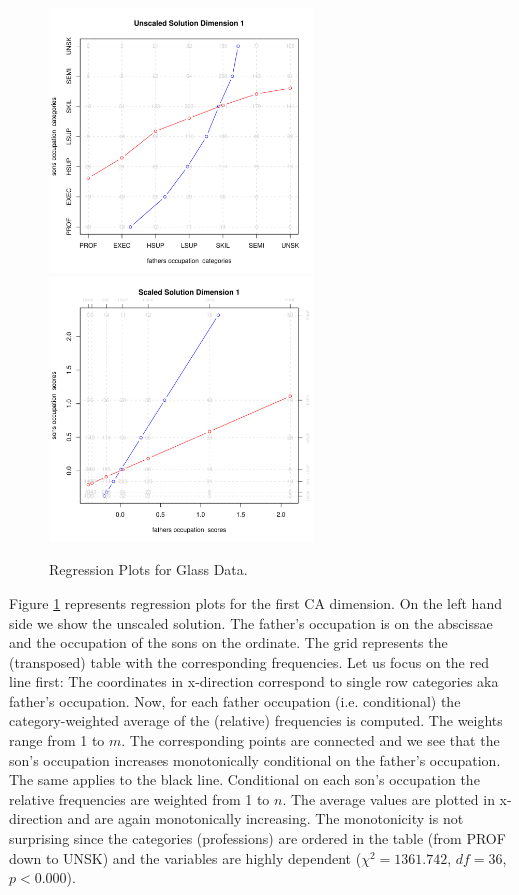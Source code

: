 \documentclass[article]{Z}
\begin{document}
\begin{figure}[h]
\begin{center}
\includegraphics[height=70mm, width=70mm]{glassreg1.pdf}
\includegraphics[height=70mm, width=70mm]{glassreg2.pdf}
\caption{\label{fig:glassreg} Regression Plots for Glass Data.}
\end{center}
\end{figure}

Figure \ref{fig:glassreg} represents regression plots for the first CA dimension. On the left hand side we show the unscaled solution. The father's occupation is on the abscissae and the occupation of the sons on the ordinate. The grid represents the (transposed) table with the corresponding frequencies. Let us focus on the red line first: The coordinates in x-direction correspond to single row categories aka father's occupation. Now, for each father occupation (i.e. conditional) the category-weighted average of the (relative) frequencies is computed. The weights range from 1 to $m$. The corresponding points are connected and we see that the son's occupation increases monotonically conditional on the father's occupation. The same applies to the black line. Conditional on each son's occupation the relative frequencies are weighted from 1 to $n$. The average values are plotted in x-direction and are again monotonically increasing. The monotonicity is not surprising since the categories (professions) are ordered in the table (from PROF down to UNSK) and the variables are highly dependent ($\chi^2 = 1361.742$, $df = 36$, $p < 0.000$).
\end{document}
